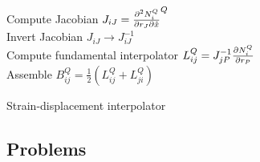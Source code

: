 \begin{algorithm}[H]
    \SetAlgoLined
    Compute Jacobian ${J_{iJ}} = \pdv{N_i^Q}{r_J}{\hat x}^Q$\\
    Invert Jacobian  ${J_{iJ}} \to J_{iJ}^{ - 1}$\\
    Compute fundamental interpolator $L_{ij}^Q = J_{jP}^{ - 1}\pdv{N_i^Q}{r_P}$\\
    Assemble $B_{ij}^Q = \frac{1}{2}\left( {L_{ij}^Q + L_{ji}^Q} \right)$ 
    \caption{Strain-displacement interpolator}
\end{algorithm}
\newpage
\subsection*{Problems}



